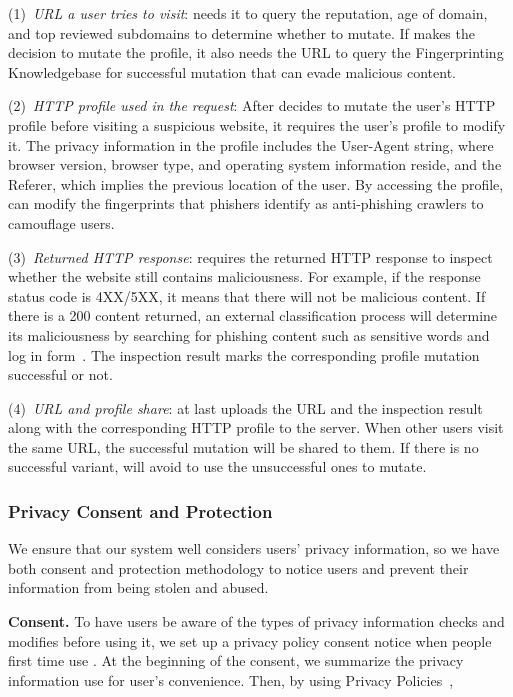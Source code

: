 (1)~\emph{URL a user tries to visit}: \spartacus needs it to query the reputation, age of domain, and top reviewed subdomains to determine whether to mutate.
If \spartacus makes the decision to mutate the profile, it also needs the URL to query the Fingerprinting Knowledgebase for successful mutation that can evade malicious content.

(2)~\emph{HTTP profile used in the request}:
After \spartacus decides to mutate the user's HTTP profile before visiting a suspicious website, it requires the user's profile to modify it.
The privacy information in the profile includes the User-Agent string, where browser version, browser type, and operating system information reside, and the Referer, which implies the previous location of the user.
By accessing the profile, \spartacus can modify the fingerprints that phishers identify as anti-phishing crawlers to camouflage users.

(3)~\emph{Returned HTTP response}:
\spartacus requires the returned HTTP response to inspect whether the website still contains maliciousness.
For example, if the response status code is 4XX/5XX, it means that there will not be malicious content.
If there is a 200 content returned,
an external classification process will determine its maliciousness by searching for phishing content such as sensitive words and log in form~\cite{xiang2011cantina+}.
The inspection result marks the corresponding profile mutation successful or not.

(4)~\emph{URL and profile share}:
\spartacus at last uploads the URL and the inspection result along with the corresponding HTTP profile to the server.
When other users visit the same URL, the successful mutation will be shared to them.
If there is no successful variant, \spartacus will avoid to use the unsuccessful ones to mutate.


\subsubsection{Privacy Consent and Protection}

We ensure that our \spartacus system well considers users' privacy information,
so we have both consent and protection methodology to notice users and prevent their information from being stolen and abused.

\noindent
\textbf{Consent.}
To have users be aware of the types of privacy information \spartacus checks and modifies before using it,
we set up a privacy policy consent notice when people first time use \spartacus.
At the beginning of the consent, we summarize the privacy information \spartacus use for user's convenience.
Then, by using Privacy Policies~\cite{privacypolicy}, 